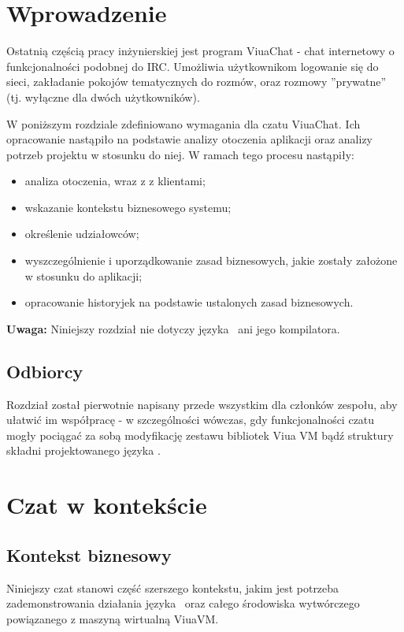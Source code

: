 \section{Wprowadzenie}

Ostatnią częścią pracy inżynierskiej jest program ViuaChat - chat internetowy o funkcjonalności podobnej do IRC.
Umożliwia użytkownikom logowanie się do sieci, zakładanie pokojów tematycznych do rozmów, oraz rozmowy
''prywatne'' (tj. wyłączne dla dwóch użytkowników).

W poniższym rozdziale zdefiniowano wymagania dla czatu ViuaChat. Ich opracowanie nastąpiło na podstawie analizy otoczenia aplikacji oraz analizy potrzeb projektu w stosunku do niej. W ramach tego procesu nastąpiły:
\begin{itemize}
    \item analiza otoczenia, wraz z z klientami;
    \item wskazanie kontekstu biznesowego systemu;
    \item określenie udziałowców;
	\item wyszczególnienie i uporządkowanie zasad biznesowych, jakie zostały założone w stosunku do aplikacji;
	\item opracowanie historyjek na podstawie ustalonych zasad biznesowych.
\end{itemize}

\textbf{Uwaga:} Niniejszy rozdział nie dotyczy języka \ViuAct\ ani jego kompilatora.

\subsection{Odbiorcy}
Rozdział został pierwotnie napisany przede wszystkim dla członków zespołu, aby ułatwić im współpracę - w
szczególności wówczas, gdy funkcjonalności czatu mogły pociągać za sobą modyfikację zestawu bibliotek Viua VM
bądź struktury składni projektowanego języka \ViuAct.

\section{Czat w kontekście}

\subsection{Kontekst biznesowy}

Niniejszy czat stanowi część szerszego kontekstu, jakim jest potrzeba zademonstrowania działania języka
\ViuAct\ oraz całego środowiska wytwórczego powiązanego z maszyną wirtualną ViuaVM.


